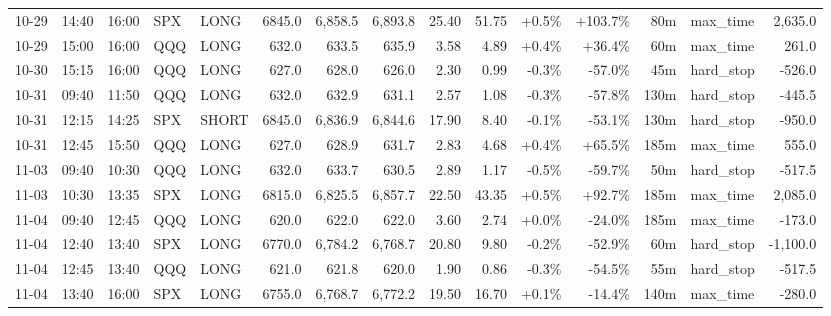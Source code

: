 \documentclass[11pt,a4paper,twoside]{article}
\begin{document}
\begin{landscape}
\begin{center}
\begin{longtable}{>{\color{txtmain}}l l l l l r r r r r r r r >{\color{txtmain}}l r}
10-29 & 14:40 & 16:00 & SPX & LONG & 6845.0 & 6,858.5 & 6,893.8 & 25.40 & 51.75 & \textcolor{wingreen}{+0.5\%} & \textcolor{wingreen}{+103.7\%} & 80m & max\_time & \textcolor{wingreen}{2,635.0} \\
10-29 & 15:00 & 16:00 & QQQ & LONG & 632.0 & 633.5 & 635.9 & 3.58 & 4.89 & \textcolor{wingreen}{+0.4\%} & \textcolor{wingreen}{+36.4\%} & 60m & max\_time & \textcolor{wingreen}{261.0} \\
10-30 & 15:15 & 16:00 & QQQ & LONG & 627.0 & 628.0 & 626.0 & 2.30 & 0.99 & \textcolor{lossred}{-0.3\%} & \textcolor{lossred}{-57.0\%} & 45m & hard\_stop & \textcolor{lossred}{-526.0} \\
10-31 & 09:40 & 11:50 & QQQ & LONG & 632.0 & 632.9 & 631.1 & 2.57 & 1.08 & \textcolor{lossred}{-0.3\%} & \textcolor{lossred}{-57.8\%} & 130m & hard\_stop & \textcolor{lossred}{-445.5} \\
10-31 & 12:15 & 14:25 & SPX & SHORT & 6845.0 & 6,836.9 & 6,844.6 & 17.90 & 8.40 & \textcolor{lossred}{-0.1\%} & \textcolor{lossred}{-53.1\%} & 130m & hard\_stop & \textcolor{lossred}{-950.0} \\
10-31 & 12:45 & 15:50 & QQQ & LONG & 627.0 & 628.9 & 631.7 & 2.83 & 4.68 & \textcolor{wingreen}{+0.4\%} & \textcolor{wingreen}{+65.5\%} & 185m & max\_time & \textcolor{wingreen}{555.0} \\
11-03 & 09:40 & 10:30 & QQQ & LONG & 632.0 & 633.7 & 630.5 & 2.89 & 1.17 & \textcolor{lossred}{-0.5\%} & \textcolor{lossred}{-59.7\%} & 50m & hard\_stop & \textcolor{lossred}{-517.5} \\
11-03 & 10:30 & 13:35 & SPX & LONG & 6815.0 & 6,825.5 & 6,857.7 & 22.50 & 43.35 & \textcolor{wingreen}{+0.5\%} & \textcolor{wingreen}{+92.7\%} & 185m & max\_time & \textcolor{wingreen}{2,085.0} \\
11-04 & 09:40 & 12:45 & QQQ & LONG & 620.0 & 622.0 & 622.0 & 3.60 & 2.74 & \textcolor{wingreen}{+0.0\%} & \textcolor{lossred}{-24.0\%} & 185m & max\_time & \textcolor{lossred}{-173.0} \\
11-04 & 12:40 & 13:40 & SPX & LONG & 6770.0 & 6,784.2 & 6,768.7 & 20.80 & 9.80 & \textcolor{lossred}{-0.2\%} & \textcolor{lossred}{-52.9\%} & 60m & hard\_stop & \textcolor{lossred}{-1,100.0} \\
11-04 & 12:45 & 13:40 & QQQ & LONG & 621.0 & 621.8 & 620.0 & 1.90 & 0.86 & \textcolor{lossred}{-0.3\%} & \textcolor{lossred}{-54.5\%} & 55m & hard\_stop & \textcolor{lossred}{-517.5} \\
11-04 & 13:40 & 16:00 & SPX & LONG & 6755.0 & 6,768.7 & 6,772.2 & 19.50 & 16.70 & \textcolor{wingreen}{+0.1\%} & \textcolor{lossred}{-14.4\%} & 140m & max\_time & \textcolor{lossred}{-280.0} \\

\end{longtable}
\end{center}
\end{landscape}
\end{document}
